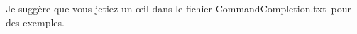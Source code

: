 \documentclass[11pt,french]{article}
\newcommand{\ctlkey}{\textsf{Ctl}}
\newcommand{\cmdkey}{\textsf{Cmd}}
\newcommand{\esckey}{\textsf{Esc}}
\newcommand{\shiftkey}{\textsf{Shift}}
\newcommand{\mnu}[1]{\textsf{#1}}
\newcommand{\To}{\,\(\to\)\,}
\newcommand{\CCT}{\textsf{CommandCompletion.txt}}
\begin{document}
Je suggère que vous jetiez un \oe{}il dans le fichier \CCT\ pour des exemples.


%
\end{document}
